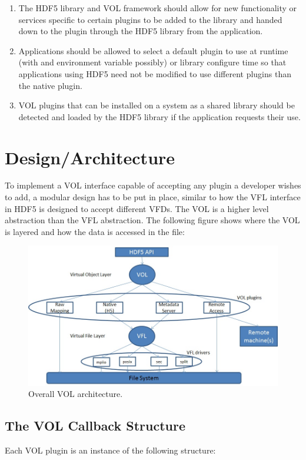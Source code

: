 \documentclass[letterpaper,hyper]{THG_RFC}
\begin{document}
\begin{enumerate}
\item The HDF5 library and VOL framework should allow for new functionality or services specific to certain plugins to be added to the library and handed down to the plugin through the HDF5 library from the application.
\item Applications should be allowed to select a default plugin to use at runtime (with and environment variable possibly) or library configure time so that applications using HDF5 need not be modified to use different plugins than the native plugin.
\item VOL plugins that can be installed on a system as a shared library should be detected and loaded by the HDF5 library if the application requests their use.
\end{enumerate}

\section{Design/Architecture}
To implement a VOL interface capable of accepting any plugin a developer wishes to add, a modular design has to be put in place, similar to how the VFL interface in HDF5 is designed to accept different VFDs. The VOL is a higher level abstraction than the VFL abstraction. The following figure shows where the VOL is layered and how the data is accessed in the file:

\begin{figure}[ht!]
\centering
\includegraphics[width=170mm]{pics/vol-arch.jpg}
\caption{Overall VOL architecture.}
\label{fig:vol-arch}
\end{figure}

\subsection{The VOL Callback Structure}
Each VOL plugin is an instance of the following structure:
\end{document}
